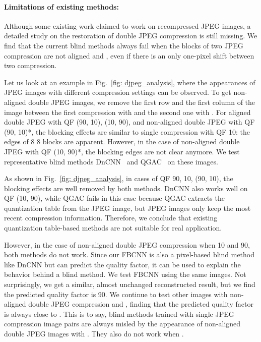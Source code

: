 \documentclass[10pt,twocolumn,letterpaper]{article}
\begin{document}
\paragraph{Limitations of existing methods:} Although some existing work claimed to work on recompressed JPEG images, a detailed study on the restoration of double JPEG compression is still missing. We find that the current blind methods always fail when the blocks of two JPEG compression are not aligned and   , even if there is an only one-pixel shift between two compression.

Let us look at an example in Fig.~\ref{fig: djpeg_analysis}, where the appearances of JPEG images with different compression settings can be observed. To get non-aligned double JPEG images, we remove the first row and the first column of the image between the first compression with  and the second one with . For aligned double JPEG with QF  (90, 10), (10, 90), and non-aligned double JPEG with QF  (90, 10)*, the blocking effects are similar to single compression with QF  10: the edges of 8  8 blocks are apparent. However, in the case of non-aligned double JPEG with QF  (10, 90)*, the blocking edges are not clear anymore. We test representative blind methods DnCNN~\cite{zhang2017beyond} and QGAC~\cite{ehrlich2020quantization} on these images. 

As shown in Fig.~\ref{fig: djpeg_analysis}, in cases of QF  90, 10, (90, 10), the blocking effects are well removed by both methods. DnCNN also works well on QF  (10, 90), while QGAC fails in this case because QGAC extracts the quantization table from the JPEG image, but JPEG images only keep the most recent compression information. Therefore, we conclude that existing quantization table-based methods are not suitable for real application.

However, in the case of non-aligned double JPEG compression when   10 and   90, both methods do not work. Since our FBCNN is also a pixel-based blind method like DnCNN but can predict the quality factor, it can be used to explain the behavior behind a blind method. We test FBCNN using the same images. Not surprisingly, we get a similar, almost unchanged reconstructed result, but we find the predicted quality factor is 90. We continue to test other images with non-aligned double JPEG compression and   , finding that the predicted quality factor is always close to . This is to say, blind methods trained with single JPEG compression image pairs are always misled by the appearance of non-aligned double JPEG images with   . They also do not work when   .
\end{document}
